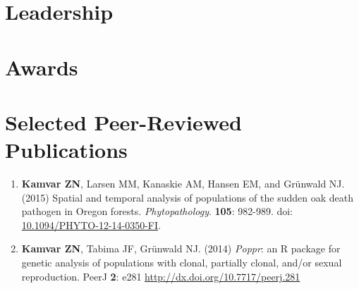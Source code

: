 \documentclass[10pt,letterpaper,sans]{modernresume} %
\begin{document}
\section{Leadership}





\section{Awards}



\section{Selected Peer-Reviewed Publications}

\begin{enumerate}

	\item \textbf{Kamvar ZN}, Larsen MM, Kanaskie AM, Hansen EM, and Gr\"unwald
	NJ. (2015) Spatial and temporal analysis of populations of the sudden oak
	death pathogen in Oregon forests. \textit{Phytopathology}. \textbf{105}:
	982-989. doi: 
	\href{http://dx.odi.org/10.1094/PHYTO-12-14-0350-FI}{10.1094/PHYTO-12-14-0350-FI}.

    \item \textbf{Kamvar ZN}, Tabima JF, Gr\"unwald NJ. (2014) \textit{Poppr}: an
	R package for genetic analysis of populations with clonal, partially clonal,
	and/or sexual reproduction. PeerJ \textbf{2}: e281
	\url{http://dx.doi.org/10.7717/peerj.281}

\end{enumerate}
\end{document}
